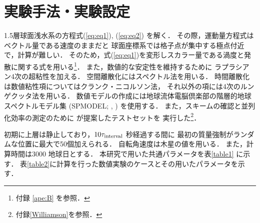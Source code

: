 \documentclass[a4j,12pt,openbib,oneside]{jreport}
\begin{document}
\section{実験手法・実験設定}
\label{sec:model2}
1.5層球面浅水系の方程式(\ref{eq:eq1}), (\ref{eq:eq2}) を解く．
その際，運動量方程式はベクトル量である速度のままだと
球面座標系では格子点が集中する極点付近で，計算が難しい．
そのため，式(\ref{eq:eq1})を変形しスカラー量である渦度と発散に関する式を用いる\footnote{付録 \ref{ape:B} を参照．}．
%
また，数値的な安定性を維持するために
ラプラシアン4次の超粘性を加える．
%
空間離散化にはスペクトル法を用いる．
時間離散化は数値粘性項についてはクランク・ニコルソン法，
それ以外の項には4次のルンゲクッタ法を用いる．
%
数値モデルの作成には地球流体電脳倶楽部の階層的地球スペクトルモデル集
(SPMODEL; \cite{spmodel2006}, \cite{spmodel2013}) を使用する．
また，スキームの確認と並列化効率の測定のために
\cite{Williamson1992} が提案したテストセットを
実行した\footnote{付録\ref{Williamson}を参照．}．

初期に上層は静止しており，$10 \tau_{{\rm{interval}}}$ 秒経過する間に
最初の質量強制がランダムな位置に最大で50個加えられる．
%
自転角速度は木星の値を用いる．
また，計算時間は3000 地球日とする．
%
本研究で用いた共通パラメータを表\ref{table1} に示す．
表\ref{table2}に計算を行った数値実験のケースとその用いたパラメータを示す．
\end{document}

